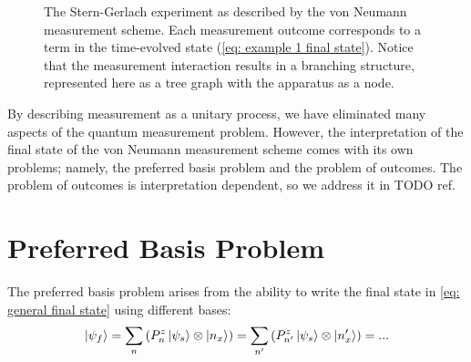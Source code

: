 \begin{figure}
\centering\CaptionFontSize
{}

\caption[Insert an abbreviated caption here to show in the List of Figures]
{The Stern-Gerlach experiment as described by the von Neumann measurement scheme. Each measurement outcome corresponds to a term in the time-evolved state (\autoref{eq: example 1 final state}). Notice that the measurement interaction results in a branching structure, represented here as a tree graph with the apparatus as a node.}
\label{Figure:Measurement:DetectorStates}
\end{figure}

By describing measurement as a unitary process, we have eliminated many aspects of the quantum measurement problem. However, the interpretation of the final state of the von Neumann measurement scheme comes with its own problems; namely, the preferred basis problem and the problem of outcomes. The problem of outcomes is interpretation dependent, so we address it in TODO ref.

\section{Preferred Basis Problem}

The preferred basis problem arises from the ability to write the final state in \autoref{eq: general final state} using different bases:
\begin{align}
  \ket{\psi_f} = \sum_{n}\left(P^z_n\ket{\psi_s} \otimes \ket{n_x}\right) = \sum_{n'}\left(P^z_{n'}\ket{\psi_s} \otimes \ket{n'_x}\right) =...
\end{align}

